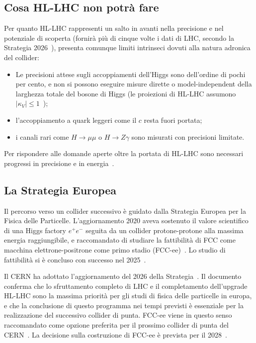 \subsection{Cosa HL-LHC non potrà fare}
Per quanto HL-LHC rappresenti un salto in avanti nella precisione e nel potenziale di scoperta (fornirà più di cinque volte i dati di LHC, secondo la Strategia 2026~\cite{ESPP:2026}), presenta comunque limiti intrinseci dovuti alla natura adronica del collider:
\begin{itemize}
    \item Le precisioni attese sugli accoppiamenti dell'Higgs sono dell'ordine di pochi per cento, e non si possono eseguire misure dirette o model-independent della larghezza totale del bosone di Higgs (le proiezioni di HL-LHC assumono $|\kappa_V|\le 1$~\cite{FCC:FSR-v1});
    \item l'accoppiamento a quark leggeri come il $c$ resta fuori portata;
    \item i canali rari come $H\to\mu\mu$ o $H\to Z\gamma$ sono misurati con precisioni limitate.
\end{itemize} 
Per rispondere alle domande aperte oltre la portata di HL-LHC sono necessari progressi in precisione e in energia~\cite{ESPP:2026}.
 
\subsection{La Strategia Europea}
Il percorso verso un collider successivo è guidato dalla Strategia Europea per la Fisica delle Particelle. L'aggiornamento 2020 aveva sostenuto il valore scientifico di una Higgs factory $e^+e^-$ seguita da un collider protone-protone alla massima energia raggiungibile, e raccomandato di studiare la fattibilità di FCC come macchina elettrone-positrone come primo stadio (FCC-ee)~\cite{ESPP:2020,ESPP:2026}. Lo studio di fattibilità si è concluso con successo nel 2025~\cite{ESPP:2026}.

Il CERN ha adottato l'aggiornamento del 2026 della Strategia~\cite{ESPP:2026-Res,CERNCourier:ESPP2026}. Il documento conferma che lo sfruttamento completo di LHC e il completamento dell'upgrade HL-LHC sono la massima priorità per gli studi di fisica delle particelle in europa, e che la conclusione di questo programma nei tempi previsti è essenziale per la realizzazione del successivo collider di punta. FCC-ee viene in questo senso raccomandato come opzione preferita per il prossimo collider di punta del CERN~\cite{ESPP:2026}. La decisione sulla costruzione di FCC-ee è prevista per il 2028~\cite{CERNCourier:ESPP2026}.

